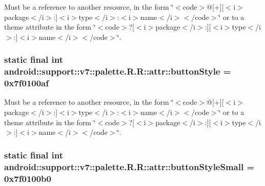 Must be a reference to another resource, in the form \char`\"{}$<$code$>$@\mbox{[}+\mbox{]}\mbox{[}$<$i$>$package$<$/i$>$:\mbox{]}$<$i$>$type$<$/i$>$:$<$i$>$name$<$/i$>$$<$/code$>$\char`\"{} or to a theme attribute in the form \char`\"{}$<$code$>$?\mbox{[}$<$i$>$package$<$/i$>$:\mbox{]}\mbox{[}$<$i$>$type$<$/i$>$:\mbox{]}$<$i$>$name$<$/i$>$$<$/code$>$\char`\"{}. \hypertarget{classandroid_1_1support_1_1v7_1_1palette_1_1_r_1_1attr_c5f04cee79d69b3458b9c0300351f10e}{
\subsubsection[{buttonStyle}]{\setlength{\rightskip}{0pt plus 5cm}static final int android::support::v7::palette.R.R::attr::buttonStyle = 0x7f0100af}}
\label{classandroid_1_1support_1_1v7_1_1palette_1_1_r_1_1attr_c5f04cee79d69b3458b9c0300351f10e}


Must be a reference to another resource, in the form \char`\"{}$<$code$>$@\mbox{[}+\mbox{]}\mbox{[}$<$i$>$package$<$/i$>$:\mbox{]}$<$i$>$type$<$/i$>$:$<$i$>$name$<$/i$>$$<$/code$>$\char`\"{} or to a theme attribute in the form \char`\"{}$<$code$>$?\mbox{[}$<$i$>$package$<$/i$>$:\mbox{]}\mbox{[}$<$i$>$type$<$/i$>$:\mbox{]}$<$i$>$name$<$/i$>$$<$/code$>$\char`\"{}. \hypertarget{classandroid_1_1support_1_1v7_1_1palette_1_1_r_1_1attr_4bc3cfd1cfb741399e984364d485243a}{
\subsubsection[{buttonStyleSmall}]{\setlength{\rightskip}{0pt plus 5cm}static final int android::support::v7::palette.R.R::attr::buttonStyleSmall = 0x7f0100b0}}
\label{classandroid_1_1support_1_1v7_1_1palette_1_1_r_1_1attr_4bc3cfd1cfb741399e984364d485243a}


